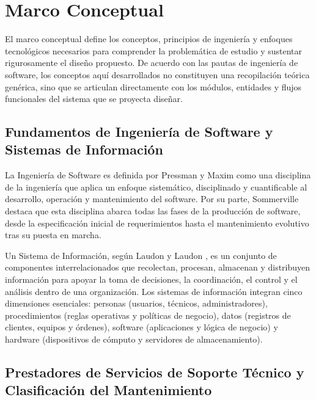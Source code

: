 \section{Marco Conceptual}

El marco conceptual define los conceptos, principios de ingeniería y enfoques tecnológicos necesarios para comprender la problemática de estudio y sustentar rigurosamente el diseño propuesto. De acuerdo con las pautas de ingeniería de software, los conceptos aquí desarrollados no constituyen una recopilación teórica genérica, sino que se articulan directamente con los módulos, entidades y flujos funcionales del sistema que se proyecta diseñar.

\subsection{Fundamentos de Ingeniería de Software y Sistemas de Información}

La Ingeniería de Software es definida por Pressman y Maxim \cite{pressman2021} como una disciplina de la ingeniería que aplica un enfoque sistemático, disciplinado y cuantificable al desarrollo, operación y mantenimiento del software. Por su parte, Sommerville \cite{sommerville2019} destaca que esta disciplina abarca todas las fases de la producción de software, desde la especificación inicial de requerimientos hasta el mantenimiento evolutivo tras su puesta en marcha.

Un Sistema de Información, según Laudon y Laudon \cite{laudon2020}, es un conjunto de componentes interrelacionados que recolectan, procesan, almacenan y distribuyen información para apoyar la toma de decisiones, la coordinación, el control y el análisis dentro de una organización. Los sistemas de información integran cinco dimensiones esenciales: personas (usuarios, técnicos, administradores), procedimientos (reglas operativas y políticas de negocio), datos (registros de clientes, equipos y órdenes), software (aplicaciones y lógica de negocio) y hardware (dispositivos de cómputo y servidores de almacenamiento).

\subsection{Prestadores de Servicios de Soporte Técnico y Clasificación del Mantenimiento}


